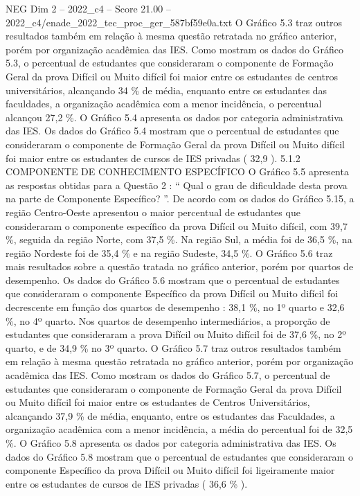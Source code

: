 \begin{textsample}{NEG Dim 2 – 2022\_c4 – Score 21.00 – 2022\_c4/enade\_2022\_tec\_proc\_ger\_587bf59e0a.txt}
O Gráfico 5.3 traz outros resultados também em relação à mesma questão retratada no gráfico anterior, porém por organização acadêmica das IES.
Como mostram os dados do Gráfico 5.3, o percentual de estudantes que consideraram o componente de Formação Geral da prova Difícil ou Muito difícil foi maior entre os estudantes de centros universitários, alcançando 34 \% de média, enquanto entre os estudantes das faculdades, a organização acadêmica com a menor incidência, o percentual alcançou 27,2 \%.
O Gráfico 5.4 apresenta os dados por categoria administrativa das IES.
Os dados do Gráfico 5.4 mostram que o percentual de estudantes que consideraram o componente de Formação Geral da prova Difícil ou Muito difícil foi maior entre os estudantes de cursos de IES privadas ( 32,9 ). 5.1.2 COMPONENTE DE CONHECIMENTO ESPECÍFICO O Gráfico 5.5 apresenta as respostas obtidas para a Questão 2 : “ Qual o grau de dificuldade desta prova na parte de Componente Específico? ”.
De acordo com os dados do Gráfico 5.15, a região Centro-Oeste apresentou o maior percentual de estudantes que consideraram o componente específico da prova Difícil ou Muito difícil, com 39,7 \%, seguida da região Norte, com 37,5 \%.
Na região Sul, a média foi de 36,5 \%, na região Nordeste foi de 35,4 \% e na região Sudeste, 34,5 \%.
O Gráfico 5.6 traz mais resultados sobre a questão tratada no gráfico anterior, porém por quartos de desempenho.
Os dados do Gráfico 5.6 mostram que o percentual de estudantes que consideraram o componente Específico da prova Difícil ou Muito difícil foi decrescente em função dos quartos de desempenho : 38,1 \%, no 1º quarto e 32,6 \%, no 4º quarto.
Nos quartos de desempenho intermediários, a proporção de estudantes que consideraram a prova Difícil ou Muito difícil foi de 37,6 \%, no 2º quarto, e de 34,9 \% no 3º quarto.
O Gráfico 5.7 traz outros resultados também em relação à mesma questão retratada no gráfico anterior, porém por organização acadêmica das IES.
Como mostram os dados do Gráfico 5.7, o percentual de estudantes que consideraram o componente de Formação Geral da prova Difícil ou Muito difícil foi maior entre os estudantes de Centros Universitários, alcançando 37,9 \% de média, enquanto, entre os estudantes das Faculdades, a organização acadêmica com a menor incidência, a média do percentual foi de 32,5 \%.
O Gráfico 5.8 apresenta os dados por categoria administrativa das IES.
Os dados do Gráfico 5.8 mostram que o percentual de estudantes que consideraram o componente Específico da prova Difícil ou Muito difícil foi ligeiramente maior entre os estudantes de cursos de IES privadas ( 36,6 \% ).

\end{textsample}

